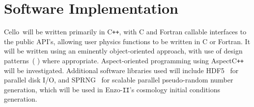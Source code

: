 \documentclass[11pt,letterpaper]{article}
\newcommand{\cello}{\textsf{Cello}}
\newcommand{\enzoii}{\textsf{Enzo}-\texttt{II}}
\newcommand{\pp}{\texttt{++}}
\newcommand{\cpp}{C\pp}
\newcommand{\code}[1]{\textsf{#1}}
\begin{document}
% 
% 

\section{Software Implementation} \label{s:implementation}

\cello\ will be written primarily in \cpp, with C and Fortran callable
interfaces to the public API's, allowing user physics functions to be
written in C or Fortran.  It will be written using an eminently
object-oriented approach, with use of design patterns~(\cite{GaHe95}
\cite{BuHe07}) where appropriate.  Aspect-oriented programming
using \code{Aspect\cpp}~\cite{wwwaspectcpp} will be investigated.
Additional software libraries used will include HDF5~\cite{hdf5} for
parallel disk I/O, and SPRNG~\cite{wwwsprng} for scalable parallel
pseudo-random number generation, which will be used in \enzoii's
cosmology initial conditions generation.
\end{document}
